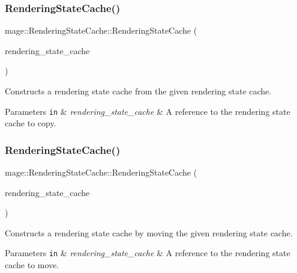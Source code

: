 \subsubsection{\texorpdfstring{Rendering\+State\+Cache()}{RenderingStateCache()}\hspace{0.1cm}{\footnotesize\ttfamily [2/3]}}
{\footnotesize\ttfamily mage\+::\+Rendering\+State\+Cache\+::\+Rendering\+State\+Cache (\begin{DoxyParamCaption}\item[{const \hyperlink{structmage_1_1_rendering_state_cache}{Rendering\+State\+Cache} \&}]{rendering\+\_\+state\+\_\+cache }\end{DoxyParamCaption})\hspace{0.3cm}{\ttfamily [delete]}}

Constructs a rendering state cache from the given rendering state cache.


\begin{DoxyParams}[1]{Parameters}
\mbox{\tt in}  & {\em rendering\+\_\+state\+\_\+cache} & A reference to the rendering state cache to copy. \\
\hline
\end{DoxyParams}
\hypertarget{structmage_1_1_rendering_state_cache_aacdb082df6180f0fe6a76f54b7b2f776}{}\label{structmage_1_1_rendering_state_cache_aacdb082df6180f0fe6a76f54b7b2f776} 
\subsubsection{\texorpdfstring{Rendering\+State\+Cache()}{RenderingStateCache()}\hspace{0.1cm}{\footnotesize\ttfamily [3/3]}}
{\footnotesize\ttfamily mage\+::\+Rendering\+State\+Cache\+::\+Rendering\+State\+Cache (\begin{DoxyParamCaption}\item[{\hyperlink{structmage_1_1_rendering_state_cache}{Rendering\+State\+Cache} \&\&}]{rendering\+\_\+state\+\_\+cache }\end{DoxyParamCaption})\hspace{0.3cm}{\ttfamily [default]}}

Constructs a rendering state cache by moving the given rendering state cache.


\begin{DoxyParams}[1]{Parameters}
\mbox{\tt in}  & {\em rendering\+\_\+state\+\_\+cache} & A reference to the rendering state cache to move. \\
\hline
\end{DoxyParams}
\hypertarget{structmage_1_1_rendering_state_cache_ac727351db3d929df122327887edc3668}{}\label{structmage_1_1_rendering_state_cache_ac727351db3d929df122327887edc3668} 
